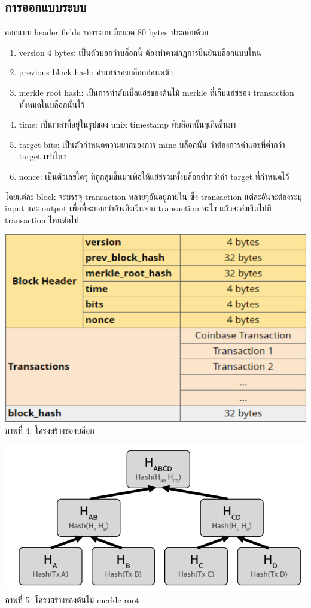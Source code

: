 \documentclass[letterpaper, 10pt, conference]{ieeeconf}
\begin{document}
\subsection{การออกแบบระบบ}
	ออกแบบ header fields ของระบบ มีขนาด 80 bytes ประกอบด้วย
	\begin{enumerate}
		\item version 4 bytes: เป็นตัวบอกว่าบล็อกนี้ ต้องทำตามกฏการยืนยันบล็อกแบบไหน
		\item previous block hash: ค่าแฮชของบล็อกก่อนหน้า
		\item merkle root hash: เป็นการทำดับเบิ้ลแฮชของต้นไม้ merkle ที่เก็บแฮชของ transaction ทั้งหมดในบล็อกนั้นไว้
		\item time: เป็นเวลาที่อยู่ในรูปของ unix timestamp ที่บล็อกนั้นๆเกิดขึ้นมา
		\item target bits: เป็นตัวกำหนดความยากของการ mine บล็อกนั้น ว่าต้องการค่าแฮชที่ต่ำกว่า target เท่าไหร่
		\item nonce: เป็นตัวเลขใดๆ ที่ถูกสุ่มขึ้นมาเพื่อให้แฮชรวมทั้งบล็อกต่ำกว่าค่า target ที่กำหนดไว้

	\end{enumerate}

	\par โดยแต่ละ block จะบรรจุ transaction หลายๆอันอยู่ภายใน ซึ่ง transaction แต่ละอันจะต้องระบุ input และ output เพื่อที่จะบอกว่าอ้างอิงเงินจาก transaction อะไร แล้วจะส่งเงินไปที่ transaction ไหนต่อไป \medskip

	{\centering 
		\includegraphics[scale=0.5]{system-detail-1} \\
		ภาพที่ 4: โครงสร้างของบล็อก \par 
	}
	\bigskip

	{\centering 
		\includegraphics[scale=0.55]{system-detail-2} \\
		ภาพที่ 5: โครงสร้างของต้นไม้ merkle root \par 
	}
	\bigskip
\end{document}
